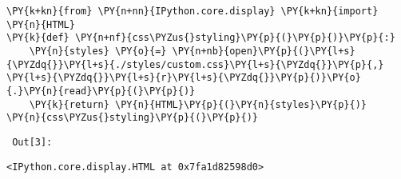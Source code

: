 {\par%
\vspace{-1\baselineskip}%
}%
\begin{notebookcell}[3]%
\begin{addmargin}[\cellleftmargin]{0em}%
{\smaller%
\par%
%
\vspace{-1\smallerfontscale}%
\begin{Verbatim}[commandchars=\\\{\}]
\PY{k+kn}{from} \PY{n+nn}{IPython.core.display} \PY{k+kn}{import} \PY{n}{HTML}
\PY{k}{def} \PY{n+nf}{css\PYZus{}styling}\PY{p}{(}\PY{p}{)}\PY{p}{:}
    \PY{n}{styles} \PY{o}{=} \PY{n+nb}{open}\PY{p}{(}\PY{l+s}{\PYZdq{}}\PY{l+s}{./styles/custom.css}\PY{l+s}{\PYZdq{}}\PY{p}{,} \PY{l+s}{\PYZdq{}}\PY{l+s}{r}\PY{l+s}{\PYZdq{}}\PY{p}{)}\PY{o}{.}\PY{n}{read}\PY{p}{(}\PY{p}{)}
    \PY{k}{return} \PY{n}{HTML}\PY{p}{(}\PY{n}{styles}\PY{p}{)}
\PY{n}{css\PYZus{}styling}\PY{p}{(}\PY{p}{)}
\end{Verbatim}
%
\par%
\vspace{-1\smallerfontscale}}%
\end{addmargin}
\end{notebookcell}

\par\vspace{1\smallerfontscale}%
    
        {\par%
        \vspace{-1\smallerfontscale}%
        \noindent%
        \begin{minipage}{\cellleftmargin}%
    \hfill%
    {\smaller%
    \tt%
    \color{nbframe-out-prompt}%
    Out[3]:}%
    \hspace{\inputpadding}%
    \hspace{0em}%
    \hspace{3pt}%
    \end{minipage}%
        }%
    \begin{addmargin}[\cellleftmargin]{0em}%
    {\smaller%
    \vspace{-1\smallerfontscale}%
    
    
    
    \begin{verbatim}
<IPython.core.display.HTML at 0x7fa1d82598d0>
    \end{verbatim}

    
}%
    \end{addmargin}%

